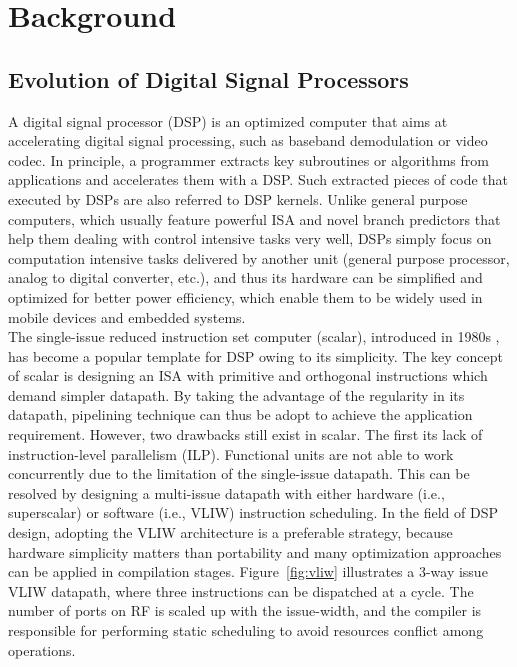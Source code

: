 \section{Background}
    \subsection{Evolution of Digital Signal Processors}
        A digital signal processor (DSP) is an optimized computer that aims at accelerating digital signal processing, such as baseband demodulation or video codec.
        In principle, a programmer extracts key subroutines or algorithms from applications and accelerates them with a DSP.
        Such extracted pieces of code that executed by DSPs are also referred to DSP kernels.
        Unlike general purpose computers, which usually feature powerful ISA and novel branch predictors that help them dealing with control intensive tasks very well,
        DSPs simply focus on computation intensive tasks delivered by another unit (general purpose processor, analog to digital converter, etc.), 
        and thus its hardware can be simplified and optimized for better power efficiency, which enable them to be widely used in mobile devices and embedded systems.
        \\\indent
        The single-issue reduced instruction set computer (scalar), introduced in 1980s \cite{risc}, has become a popular template for DSP owing to its simplicity.
        The key concept of scalar is designing an ISA with primitive and orthogonal instructions which demand simpler datapath.
        By taking the advantage of the regularity in its datapath, pipelining technique can thus be adopt to achieve the application requirement.
        However, two drawbacks still exist in scalar. 
        The first its lack of instruction-level parallelism (ILP). 
        Functional units are not able to work concurrently due to the limitation of the single-issue datapath.
        This can be resolved by designing a multi-issue datapath with either hardware (i.e., superscalar) or software (i.e., VLIW) instruction scheduling.
        In the field of DSP design, adopting the VLIW architecture is a preferable strategy, 
        because hardware simplicity matters than portability and many optimization approaches can be applied in compilation stages. 
        Figure~\ref{fig:vliw} illustrates a 3-way issue VLIW datapath, where three instructions can be dispatched at a cycle.
        The number of ports on RF is scaled up with the issue-width, and the compiler is responsible for performing static scheduling to avoid resources conflict among operations.
